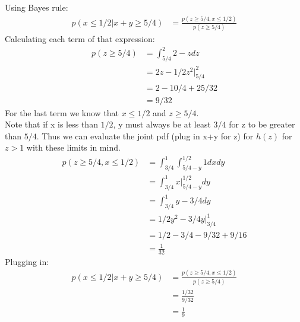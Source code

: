 \documentclass{article}
\newcommand{\1}{\mathbf{1}}
\begin{document}
Using Bayes rule:
\begin{align}
    p(x\le 1/2 | x + y \ge 5/4) & = \frac{p(z\ge 5/4, x\le 1/2) }{p(z\ge 5/4)} 
\end{align}
Calculating each term of that expression:
\begin{align}
    p(z \ge 5/4 ) & = \int_{5/4}^2 2-z dz \\
     & = 2z - 1/2z^2 |_{5/4}^2 \\
     & = 2 - 10/4 +25/32 \\
     & = 9/32
\end{align}
For the last term we know that $x \le 1 / 2$ and $z \ge 5/4$. \\
Note that if x is less than $1/2$, y must always be at least $3/4$ for z to be greater than $5/4$. 
Thus we can evaluate the joint pdf (plug in x+y for z) for $h(z)$ for $z > 1$ with these limits in mind.\\
\begin{align}
    p(z\ge 5/4 , x\le 1/2) & = \int_{3/4}^{1} \int_{5/4-y}^{1/2} 1 dx dy  \\
    & = \int_{3/4}^{1} x|_{5/4-y}^{1/2} dy\\
    & = \int_{3/4}^{1} y-3/4  dy\\
    & =  1/2y^2-3/4y |_{3/4}^{1}  \\
    & = 1/2 -3/4 - 9/32 + 9/16 \\
    & = \frac{1}{32}
\end{align}
Plugging 
in:
\begin{align}
    p(x\le 1/2 | x + y \ge 5/4) & = \frac{p(z\ge 5/4 , x\le 1/2) }{p(z\ge 5/4)} \\
    & = \frac{ 1/32   }{ 9/32 } \\
    & = \frac{1}{9}
\end{align}
\end{document}
